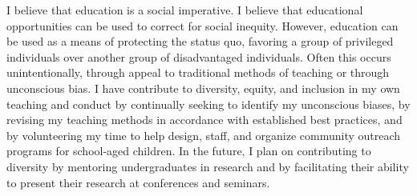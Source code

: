 \documentclass[11pt]{article}
\begin{document}

\makeletterhead

\vspace{0.5in}

\maketitle

\vspace{0.5in}

I believe that education is a social imperative. I believe that
educational opportunities can be used to correct for social inequity.
However, education can be used as a means of protecting the status quo,
favoring a group of privileged individuals over another group of
disadvantaged individuals. Often this occurs unintentionally, through
appeal to traditional methods of teaching or through unconscious bias. I
have contribute to diversity, equity, and inclusion in my own teaching
and conduct by continually seeking to identify my unconscious biases, by
revising my teaching methods in accordance with established best
practices, and by volunteering my time to help design, staff, and
organize community outreach programs for school-aged children. In the
future, I plan on contributing to diversity by mentoring undergraduates
in research and by facilitating their ability to present their research
at conferences and seminars.
\end{document}
